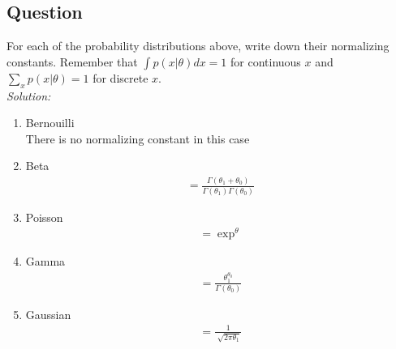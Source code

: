 \documentclass[12pt,a4paper]{article}
\begin{document}
\subsection{Question}
For each of the probability distributions above, write down their normalizing constants.  Remember that $\int p(x|\theta) d x = 1$ for continuous $x$ and $\sum_x p(x| \theta) = 1$ for discrete $x$.  \\
	\emph{Solution:} \\
			\begin{enumerate}
				\item{Bernouilli} \\
				There is no normalizing constant in this case
				
				\item{Beta}
				\begin{align*}
					= \frac{\Gamma (\theta_1 + \theta_0)}{\Gamma (\theta_1) \Gamma (\theta_0)}
				\end{align*}
				
				\item{Poisson}
				\begin{align*}
					= \exp^{\theta}
				\end{align*}
				
				\item{Gamma}
				\begin{align*}
					= \frac{\theta_{1}^{\theta_{0}}}{\Gamma (\theta_{0})}
				\end{align*}
				
				\item{Gaussian}
				\begin{align*}
					= \frac{1}{\sqrt[]{2\pi \theta_{1}}}
				\end{align*}
				
			\end{enumerate}
\end{document}
